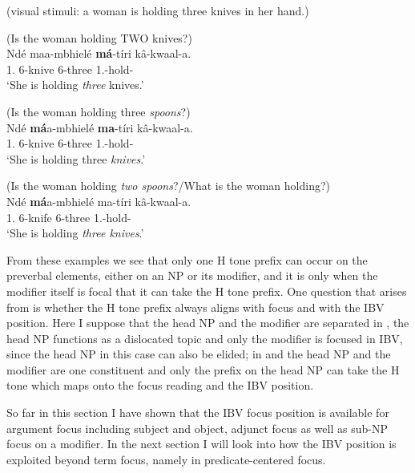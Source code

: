 \documentclass[output=paper,colorlinks,citecolor=brown,
]{langscibook}
\begin{document}
\begin{exe}
     \ex (visual stimuli: a woman is holding three knives in her hand.)\label{44}
    \begin{xlist}
\ex
\label{44a}
 (Is the woman holding TWO knives?)\\
\gll
Ndé maa-mbhielé \textbf{má}-tíri kâ-kwaal-a.\\
1.\Pro{} 6-knive 6-three 1\Sm{}.\Prs{}-hold-\Fv{}\\
\trans ‘She is holding \textit{three} knives.’

\ex
\label{44b}
 (Is the woman holding three \textit{spoons}?)\\
\gll
Ndé \textbf{má}a-mbhielé \textbf{ma}-tíri kâ-kwaal-a.\\
1.\Pro{} 6-knive 6-three 1\Sm{}.\Prs{}-hold-\Fv{}\\
\trans ‘She is holding three \textit{knives}.’

\ex
\label{44c}
 (Is the woman holding \textit{two spoons}?/What is the woman holding?) \\
\gll
Ndé \textbf{má}a-mbhielé ma-tíri kâ-kwaal-a.\\
1.\Pro{} 6-knife 6-three 1\Sm{}.\Prs{}-hold-\Fv{}\\
\trans ‘She is holding \textit{three knives}.’

    \end{xlist}
\end{exe}
From these examples we see that only one H tone prefix can occur on the preverbal elements, either on an NP or its modifier, and it is only when the modifier itself is focal that it can take the H tone prefix. One question that arises from  is whether the H tone prefix always aligns with focus and with the IBV position. Here I suppose that the head NP and the modifier are separated in , the head NP functions as a dislocated topic and only the modifier is focused in IBV, since the head NP in this case can also be elided; in  and  the head NP and the modifier are one constituent and only the prefix on the head NP can take the H tone which maps onto the focus reading and the IBV position.

So far in this section I have shown that the IBV focus position is available for argument focus including subject and object, adjunct focus as well as sub-NP focus on a modifier. In the next section I will look into how the IBV position is exploited beyond term focus, namely in predicate-centered focus.
\end{document}
